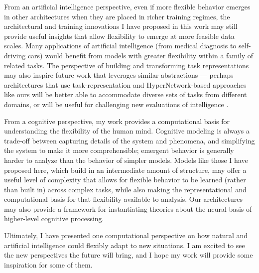 From an artificial intelligence perspective, even if more flexible behavior emerges in other architectures when they are placed in richer training regimes, the architectural and training innovations I have proposed in this work may still provide useful insights that allow flexibility to emerge at more feasible data scales. Many applications of artificial intelligence (from medical diagnosis to self-driving cars) would benefit from models with greater flexibility within a family of related tasks. The perspective of building and transforming task representations may also inspire future work that leverages similar abstractions --- perhaps architectures that use task-representation and HyperNetwork-based approaches like ours will be better able to accommodate diverse sets of tasks from different domains, or will be useful for challenging new evaluations of intelligence \citep[e.g.][]{Chollet2019}. \par 

From a cognitive perspective, my work provides a computational basis for understanding the flexibility of the human mind. Cognitive modeling is always a trade-off between capturing details of the system and phenomena, and simplifying the system to make it more comprehensible; emergent behavior is generally harder to analyze than the behavior of simpler models. Models like those I have proposed here, which build in an intermediate amount of structure, may offer a useful level of complexity that allows for flexible behavior to be learned (rather than built in) across complex tasks, while also making the representational and computational basis for that flexibility available to analysis. Our architectures may also provide a framework for instantiating theories about the neural basis of higher-level cognitive processing. \par 

Ultimately, I have presented one computational perspective on how natural and artificial intelligence could flexibly adapt to new situations. I am excited to see the new perspectives the future will bring, and I hope my work will provide some inspiration for some of them. 
